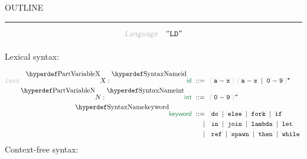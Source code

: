


    OUTLINE
  \tableofcontents
\begin{center}
\rule{3in}{0.4pt}
\end{center}

\begin{displaymath}
\KEY{Language} \quad \STRING{LD}
\end{displaymath}

\begin{align*}
  [ \
  \textsf{\SECTREF{1}} \ & \textsf{Lexical constructs} \\
  \textsf{\SECTREF{2}} \ & \textsf{Call-by-value lambda-calculus} \\
  \textsf{\SECTREF{3}} \ & \textsf{Arithmetic and Boolean expressions} \\
  \textsf{\SECTREF{4}} \ & \textsf{References and imperatives} \\
  \textsf{\SECTREF{5}} \ & \textsf{Multithreading} \\
  \textsf{\SECTREF{6}} \ & \textsf{Programs} \\
  \textsf{\SECTHYPER{../.}{LD-Disambiguation}{A}} \ & \textsf{Disambiguation}
  \ ]
\end{align*}
Lexical syntax:

\begin{align*}
  \KEY{Lexis} \quad
    \VARDECL{X} : \SYNDECL{id}
      \ ::= \ & \
      \LEFTGROUP \LEX{a} {-} \LEX{z} \RIGHTGROUP \ \LEFTGROUP \LEX{a} {-} \LEX{z} \mid \LEX{0} {-} \LEX{9} \RIGHTGROUP\STAR
    \\
    \VARDECL{N} : \SYNDECL{int}
      \ ::= \ & \
      \LEFTGROUP \LEX{0} {-} \LEX{9} \RIGHTGROUP\PLUS
    \\
     \SYNDECL{keyword}
      \ ::= \ & \
      \LEX{do} \mid \LEX{else} \mid \LEX{fork} \mid \LEX{if} \\
      \ \mid \ & \ \LEX{in} \mid \LEX{join} \mid \LEX{lambda} \mid \LEX{let} \\
      \ \mid \ & \ \LEX{ref} \mid \LEX{spawn} \mid \LEX{then} \mid \LEX{while}
\end{align*}
Context-free syntax:

